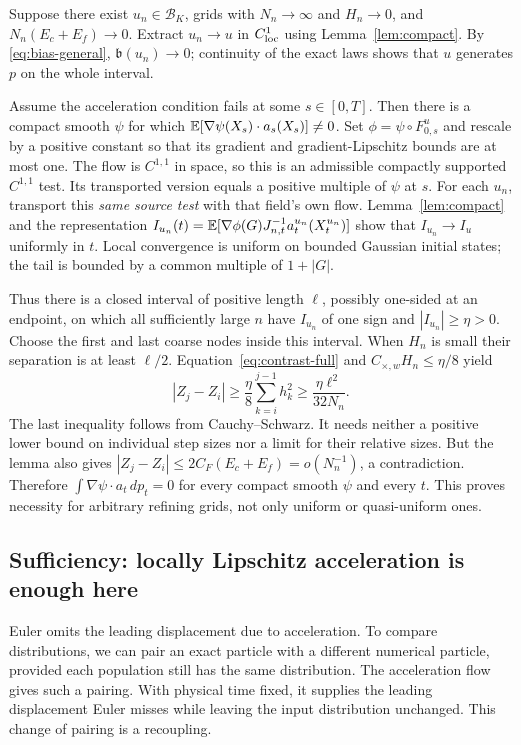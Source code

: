Suppose there exist $u_n\in\mathcal B_K$, grids with $N_n\to\infty$ and
$H_n\to0$, and $N_n(E_c+E_f)\to0$. Extract $u_n\to u$ in
$C^1_{\rm loc}$ using Lemma~\ref{lem:compact}. By
\eqref{eq:bias-general}, $\mathfrak b(u_n)\to0$; continuity of the
exact laws shows that $u$ generates $p$ on the whole interval.

Assume the acceleration condition fails at some $s\in[0,T]$. Then there
is a compact smooth $\psi$ for which
$\mathbb E[\nabla\psi(X_s)\cdot a_s(X_s)]\ne0$.
Set $\phi=\psi\circ F^u_{0,s}$ and rescale by a positive constant so that
its gradient and gradient-Lipschitz bounds are at most one. The flow is
$C^{1,1}$ in space, so this is an admissible compactly supported $C^{1,1}$
test. Its transported version equals a positive multiple of $\psi$ at $s$.
For each $u_n$, transport this \emph{same source test} with that field's
own flow. Lemma~\ref{lem:compact} and the representation
$I_{u_n}(t)=\mathbb E[\nabla\phi(G)J_{n,t}^{-1}a^{u_n}_t(X^{u_n}_t)]$
show that $I_{u_n}\to I_u$ uniformly in $t$. Local convergence is uniform
on bounded Gaussian initial states; the tail is bounded by a common
multiple of $1+|G|$.

Thus there is a closed interval of positive length $\ell$, possibly
one-sided at an endpoint, on which all sufficiently large $n$ have
$I_{u_n}$ of one sign and $|I_{u_n}|\ge\eta>0$.
Choose the first and last coarse nodes inside this interval. When $H_n$
is small their separation is at least $\ell/2$. Equation~\eqref{eq:contrast-full}
and $C_{\times,w}H_n\le\eta/8$ yield
\[
 |Z_j-Z_i|\ge\frac\eta8\sum_{k=i}^{j-1}h_k^2
 \ge\frac{\eta\ell^2}{32N_n}.
\]
The last inequality follows from Cauchy--Schwarz. It needs neither a positive
lower bound on individual step sizes nor a limit for their relative sizes.
But the lemma also gives
$|Z_j-Z_i|\le2C_F(E_c+E_f)=o(N_n^{-1})$, a contradiction.
Therefore $\int\nabla\psi\cdot a_t\,dp_t=0$ for every compact smooth
$\psi$ and every $t$. This proves necessity for arbitrary refining grids,
not only uniform or quasi-uniform ones.

\subsection{Sufficiency: locally Lipschitz acceleration is enough here}
Euler omits the leading displacement due to acceleration. To compare
distributions, we can pair an exact particle with a different numerical
particle, provided each population still has the same distribution.
The acceleration flow gives such a pairing. With physical time fixed,
it supplies the leading displacement Euler misses while leaving the
input distribution unchanged. This change of
pairing is a recoupling.

